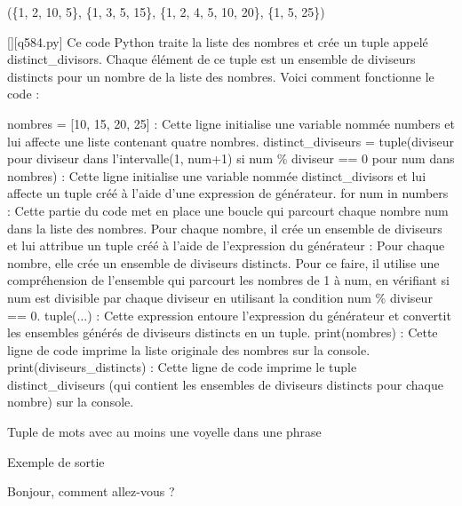 (\{1, 2, 10, 5\}, \{1, 3, 5, 15\}, \{1, 2, 4, 5, 10, 20\}, \{1, 5, 25\})
        \par
        \begin{solution}
            \renewcommand{\nomfichier}{q584.py}
            \pythonfile{\chemincode \nomfichier}[][\nomfichier]
            Ce code Python traite la liste des nombres et crée un tuple appelé distinct\_divisors. Chaque élément de ce tuple est un ensemble de diviseurs distincts pour un nombre de la liste des nombres. Voici comment fonctionne le code :

    nombres = [10, 15, 20, 25] : Cette ligne initialise une variable nommée numbers et lui affecte une liste contenant quatre nombres.
    distinct\_diviseurs = tuple({diviseur pour diviseur dans l'intervalle(1, num+1) si num \% diviseur == 0} pour num dans nombres) : Cette ligne initialise une variable nommée distinct\_divisors et lui affecte un tuple créé à l'aide d'une expression de générateur.
        for num in numbers : Cette partie du code met en place une boucle qui parcourt chaque nombre num dans la liste des nombres.
        Pour chaque nombre, il crée un ensemble de diviseurs et lui attribue un tuple créé à l'aide de l'expression du générateur : Pour chaque nombre, elle crée un ensemble de diviseurs distincts. Pour ce faire, il utilise une compréhension de l'ensemble qui parcourt les nombres de 1 à num, en vérifiant si num est divisible par chaque diviseur en utilisant la condition num \% diviseur == 0.
        tuple(...) : Cette expression entoure l'expression du générateur et convertit les ensembles générés de diviseurs distincts en un tuple.
    print(nombres) : Cette ligne de code imprime la liste originale des nombres sur la console.
    print(diviseurs\_distincts) : Cette ligne de code imprime le tuple distinct\_diviseurs (qui contient les ensembles de diviseurs distincts pour chaque nombre) sur la console.
        \end{solution}
        

        \question
        Tuple de mots avec au moins une voyelle dans une phrase

Exemple de sortie

Bonjour, comment allez-vous ?

